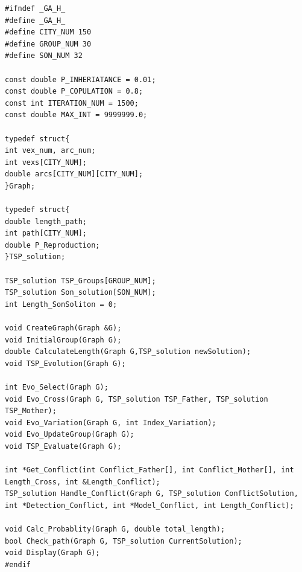 \documentclass[a4paper,man,natbib]{apa6}
\begin{document}
\begin{lstlisting}
#ifndef _GA_H_
#define _GA_H_
#define CITY_NUM 150				
#define GROUP_NUM 30				
#define SON_NUM 32				

const double P_INHERIATANCE = 0.01;	
const double P_COPULATION = 0.8;	
const int ITERATION_NUM = 1500;		
const double MAX_INT = 9999999.0;

typedef struct{
int vex_num, arc_num;			
int vexs[CITY_NUM];			
double arcs[CITY_NUM][CITY_NUM];	
}Graph;

typedef struct{
double length_path;
int path[CITY_NUM];
double P_Reproduction;
}TSP_solution;

TSP_solution TSP_Groups[GROUP_NUM];		
TSP_solution Son_solution[SON_NUM];		
int Length_SonSoliton = 0;			

void CreateGraph(Graph &G);
void InitialGroup(Graph G);
double CalculateLength(Graph G,TSP_solution newSolution);
void TSP_Evolution(Graph G);	

int Evo_Select(Graph G);		
void Evo_Cross(Graph G, TSP_solution TSP_Father, TSP_solution TSP_Mother);	
void Evo_Variation(Graph G, int Index_Variation);	
void Evo_UpdateGroup(Graph G);
void TSP_Evaluate(Graph G);			

int *Get_Conflict(int Conflict_Father[], int Conflict_Mother[], int Length_Cross, int &Length_Conflict);	
TSP_solution Handle_Conflict(Graph G, TSP_solution ConflictSolution, int *Detection_Conflict, int *Model_Conflict, int Length_Conflict);	

void Calc_Probablity(Graph G, double total_length);	
bool Check_path(Graph G, TSP_solution CurrentSolution);
void Display(Graph G);
#endif
\end{lstlisting}
\end{document}
